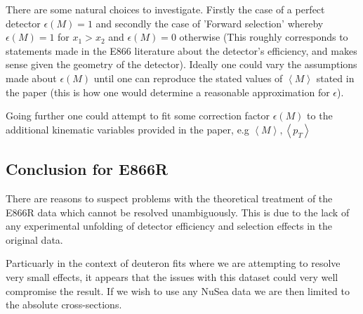 \documentclass[11pt]{article}
\begin{document}
There are some natural choices to investigate. Firstly the case of a perfect detector $\epsilon(M) = 1$ and secondly
the case of 'Forward selection' whereby $\epsilon(M) = 1$ for $x_1>x_2$ and $\epsilon(M) = 0$ otherwise (This roughly
corresponds to statements made in the E866 literature about the detector's efficiency, and makes sense given the
geometry of the detector). Ideally one could vary the assumptions made about $\epsilon(M)$ until one can reproduce
the stated values of $\left<M\right>$ stated in the paper (this is how one would determine a reasonable approximation
for $\epsilon$).

Going further one could attempt to fit some correction factor $\epsilon(M)$ to the additional kinematic variables
provided in the paper, e.g $\left<M\right>, \left<p_T\right>$

\subsection{Conclusion for E866R}

There are reasons to suspect problems with the theoretical treatment of the E866R data which cannot be resolved unambiguously.
This is due to the lack of any experimental unfolding of detector efficiency and selection effects in the original data.

Particuarly in the context of deuteron fits where we are attempting to resolve very small effects, it appears that the
issues with this dataset could very well compromise the result. If we wish to use any NuSea data we are then limited to the absolute cross-sections.
\end{document}
